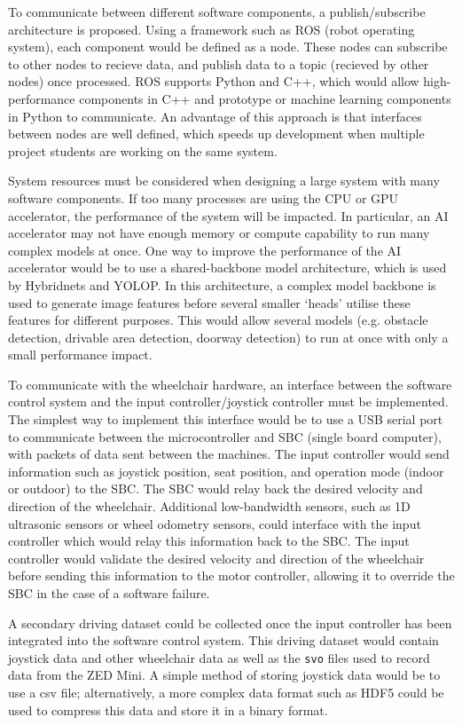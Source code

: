 To communicate between different software components, a publish/subscribe architecture
is proposed. Using a framework such as ROS (robot operating system), each component would
be defined as a node. These nodes can subscribe to other nodes to recieve data,
and publish data to a topic (recieved by other nodes) once processed. ROS supports Python and C++, which would allow
high-performance components in C++ and prototype or machine learning components in Python
to communicate. An advantage of this approach is that interfaces between nodes
are well defined, which speeds up development when multiple project students
are working on the same system.

System resources must be considered when designing a large system with many software components.
If too many processes are using the CPU or GPU accelerator, the performance of the system
will be impacted. In particular, an AI accelerator may not have enough memory or compute capability to run many complex
models at once. One way to improve the performance of the AI accelerator would be to use a shared-backbone model
architecture, which is used by Hybridnets and YOLOP. In this architecture, a complex model backbone
is used to generate image features before several smaller `heads' utilise these features for different purposes.
This would allow several models (e.g. obstacle detection, drivable area detection, doorway detection)
to run at once with only a small performance impact.

To communicate with the wheelchair hardware, an interface between the software control system and the
input controller/joystick controller must be implemented. The simplest way to implement this
interface would be to use a USB serial port to communicate between the microcontroller and
SBC (single board computer), with packets of data sent between the machines.
The input controller would send information such as joystick position,
seat position, and operation mode (indoor or outdoor) to the SBC. The SBC would relay back the
desired velocity and direction of the wheelchair. Additional low-bandwidth sensors, such as
1D ultrasonic sensors or wheel odometry sensors, could interface with the input controller
which would relay this information back to the SBC. The input controller would validate
the desired velocity and direction of the wheelchair before sending this information
to the motor controller, allowing it to override the SBC in the case of a software failure.

A secondary driving dataset could be collected once the input controller has been integrated into
the software control system. This driving dataset would contain joystick data and other wheelchair data
as well as the \texttt{svo} files used to record data from the ZED Mini. A simple method of storing joystick
data would be to use a csv file; alternatively, a more complex data format such as HDF5 could be used
to compress this data and store it in a binary format.

